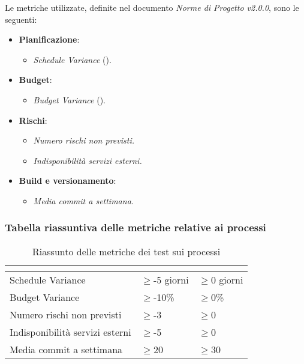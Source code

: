 Le metriche utilizzate, definite nel documento \emph{Norme di Progetto v2.0.0}, sono le seguenti:
\begin{itemize}
	\item{\textbf{Pianificazione}: 
		\begin{itemize}
			\item{\emph{Schedule Variance} ().}
		\end{itemize}
	}
	\item{\textbf{Budget}: 
		\begin{itemize}
			\item{\emph{Budget Variance} ().}
		\end{itemize}	
	}
	\item{\textbf{Rischi}:
		\begin{itemize}
			\item\emph{Numero rischi non previsti.}
			\item\emph{Indisponibilità servizi esterni.}	
		\end{itemize}	
	}
	\item{\textbf{Build e versionamento}: 
		\begin{itemize}
			\item\emph{Media commit a settimana.}
		\end{itemize}	
	}
\end{itemize}

\subsubsection{Tabella riassuntiva delle metriche relative ai processi}
\renewcommand{\arraystretch}{1.5}
\begin{table}[H]
	\centering
	\begin{tabular}{|C{5cm}|C{4cm}|C{4cm}|}
		\hline
		\textbf{\color{title_text}{Nome Metrica}} &  \textbf{\color{title_text}{Range accettabile}} & \textbf{\color{title_text}{Range ottimale}} \\ \hline
		Schedule Variance & $\geq$-5 giorni  & $\geq$0 giorni \\ \hline
		Budget Variance&$\geq$-10\% &$\geq$0\% \\ \hline
		Numero rischi non previsti&$\geq$-3 &$\geq$0 \\ \hline
		Indisponibilità servizi esterni&$\geq$-5 &$\geq$0 \\ \hline
		Media commit a settimana&$\geq$20 &$\geq$30 \\ \hline

	\end{tabular}
	\caption{Riassunto delle metriche dei test sui processi}
	\label{tabella:riassunto metriche dei test sui processi}
\end{table}
\renewcommand{\arraystretch}{1}

